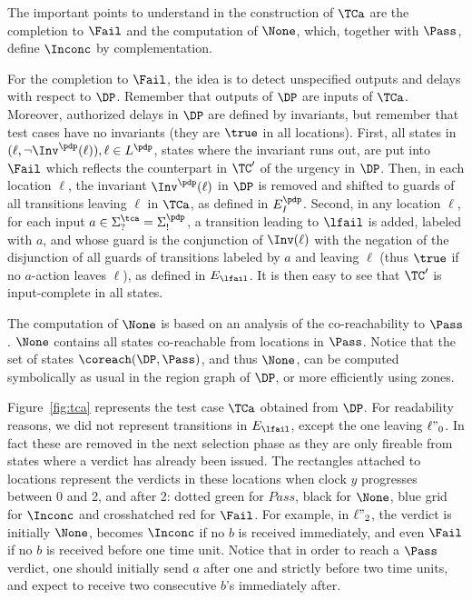 \documentclass{LMCS}
\theoremstyle{plain}\newtheorem{proposition}[thm]{Proposition}
\begin{document}
\noindent The important points to understand in the construction of $\TCa$ are
the completion to $\Fail$ and the computation of $\None$,
which, together with $\Pass$,  define $\Inconc$ by complementation.  

For the
completion to $\Fail$, the idea is to detect unspecified outputs and delays 
with respect to $\DP$.  
Remember that outputs of $\DP$ are inputs of $\TCa$. 
Moreover, authorized delays in $\DP$ are defined by invariants, 
but remember that test cases have no invariants (they are $\true$ in all locations).
First, all states in $(\ell,\neg\Inv^\pdp(\ell)), \ell \in L^\pdp$, \ie
states where the invariant runs out, are put into $\Fail$
which reflects the counterpart in $\TC'$ of the urgency in $\DP$. 
Then, in each location $\ell$, the invariant $\Inv^\pdp(\ell)$ in $\DP$ is
removed and shifted to guards of all transitions leaving $\ell$ in
$\TCa$, as defined in $E_I^\pdp$.
Second, in any location $\ell$, for each input $a\in\Sigma_?^\tca=\Sigma_!^\pdp$, a transition
leading to $\lfail$ is added, labeled with $a$, and whose guard is
the conjunction of $\Inv(\ell)$ 
with the negation of the disjunction of all guards of transitions labeled
by $a$ and leaving $\ell$ (thus $\true$ if no $a$-action leaves
$\ell$), as defined in $E_{\lfail}$.  
It is then easy to see that $\TC'$ is input-complete in all states.

 




The computation of $\None$ is based on an analysis of the
co-reachability to $\Pass$.  
$\None$ contains all states co-reachable from locations in $\Pass$.  
Notice that the set of states $\coreach(\DP,\Pass)$, and thus $\None$,
can be computed symbolically as usual in the region graph
of $\DP$, or more efficiently using zones.

\begin{exa}
  Figure~\ref{fig:tca} represents the test case $\TCa$ obtained from
  $\DP$.  For readability reasons, we did not represent transitions in
  $E_{\lfail}$, except the one leaving $\ell"_0$.  In fact these are
  removed in the next selection phase as they are only fireable from
  states where a verdict has already been issued.  The rectangles
  attached to locations represent the verdicts in these locations when
  clock $y$ progresses between 0 and 2, and after 2: dotted green for
  $Pass$, black for $\None$, blue grid for $\Inconc$ and
  crosshatched red for $\Fail$.  For example, in $\ell"_2$, the
  verdict is initially $\None$, becomes $\Inconc$ if no $b$ is
  received immediately, and even $\Fail$ if no $b$ is received before
  one time unit.  Notice that in order to reach a $\Pass$ verdict, one
  should initially send $a$ after one and strictly before two time
  units, and expect to receive two consecutive $b$'s immediately
  after.
\end{exa}
\end{document}
